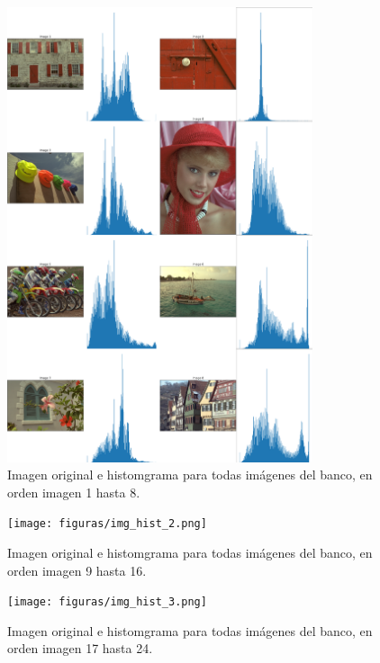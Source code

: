 \begin{figure}
    \centering
    \includegraphics[width=0.8\textwidth]{figuras/img_hist_1.png}
    \caption{Imagen original e histomgrama para todas im\'agenes del banco, en orden imagen 1 hasta 8.}
\end{figure}

\begin{figure}
    \centering
    \texttt{[image: figuras/img\_hist\_2.png]}
    \caption{Imagen original e histomgrama para todas im\'agenes del banco, en orden imagen 9 hasta 16.}
\end{figure}

\begin{figure}
    \centering
    \texttt{[image: figuras/img\_hist\_3.png]}
    \caption{Imagen original e histomgrama para todas im\'agenes del banco, en orden imagen 17 hasta 24.}
\end{figure}

